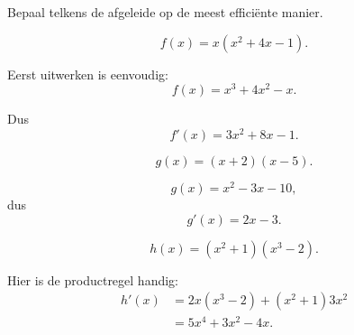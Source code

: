 \documentclass{ximera}
\begin{document}

\begin{oefening}{\oefB\ESS}

Bepaal telkens de afgeleide op de meest efficiënte manier.

\begin{question}
\[
f(x)=x(x^2+4x-1).
\]

\begin{oplossing}
Eerst uitwerken is eenvoudig:
\[
f(x)=x^3+4x^2-x.
\]

Dus
\[
\boxed{f'(x)=3x^2+8x-1}.
\]
\end{oplossing}
\end{question}


\begin{question}
\[
g(x)=(x+2)(x-5).
\]

\begin{oplossing}
\[
g(x)=x^2-3x-10,
\]
dus
\[
\boxed{g'(x)=2x-3}.
\]
\end{oplossing}
\end{question}


\begin{question}
\[
h(x)=(x^2+1)(x^3-2).
\]

\begin{oplossing}
Hier is de productregel handig:
\[
\begin{aligned}
h'(x)
&=2x(x^3-2)+(x^2+1)3x^2\\
&=5x^4+3x^2-4x.
\end{aligned}
\]
\end{oplossing}
\end{question}

\end{oefening}


\end{document}
